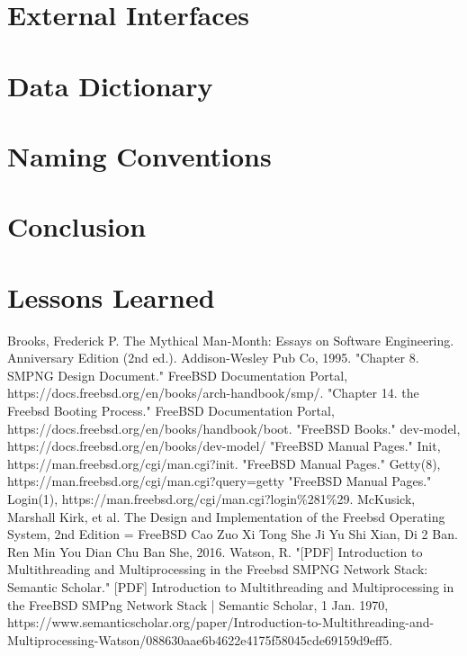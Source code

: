\documentclass[12pt, dvipsnames, a4paper]{article}
\begin{document}
\section{External Interfaces}
\lipsum[1]

\section{Data Dictionary}
\lipsum[1]

\section{Naming Conventions}
\lipsum[1]

\section{Conclusion}
\lipsum[1]

\section{Lessons Learned}
\lipsum[1]

\begin{thebibliography}{00}
	 Brooks, Frederick P. The Mythical Man-Month: Essays on Software Engineering. Anniversary Edition (2nd ed.). Addison-Wesley Pub Co, 1995. 
	 "Chapter 8. SMPNG Design Document." FreeBSD Documentation Portal, https://docs.freebsd.org/en/books/arch-handbook/smp/.
	 "Chapter 14. the Freebsd Booting Process." FreeBSD Documentation Portal, https://docs.freebsd.org/en/books/handbook/boot.
	 "FreeBSD Books." dev-model, https://docs.freebsd.org/en/books/dev-model/
	 "FreeBSD Manual Pages." Init, https://man.freebsd.org/cgi/man.cgi?init.
	 "FreeBSD Manual Pages." Getty(8), https://man.freebsd.org/cgi/man.cgi?query=getty
	 "FreeBSD Manual Pages." Login(1), https://man.freebsd.org/cgi/man.cgi?login\%281\%29.
	 McKusick, Marshall Kirk, et al. The Design and Implementation of the Freebsd Operating System, 2nd Edition = FreeBSD Cao Zuo Xi Tong She Ji Yu Shi Xian, Di 2 Ban. Ren Min You Dian Chu Ban She, 2016.
	 Watson, R. "[PDF] Introduction to Multithreading and Multiprocessing in the Freebsd SMPNG Network Stack: Semantic Scholar." [PDF]  Introduction to Multithreading and Multiprocessing in the FreeBSD SMPng Network Stack | Semantic Scholar, 1 Jan. 1970, https://www.semanticscholar.org/paper/Introduction-to-Multithreading-and-Multiprocessing-Watson/088630aae6b4622e4175f58045cde69159d9eff5.
\end{thebibliography}
\end{document}
